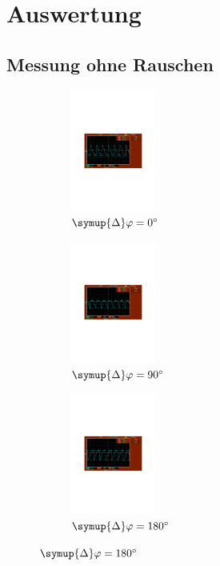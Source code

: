 \section{Auswertung}
\label{sec:Auswertung}

\subsection{Messung ohne Rauschen}
\label{sec:ohne rauschen}

\begin{figure}
  \begin{subfigure}{0.48\textwidth}
    \centering
    \includegraphics[height=4cm]{content/Bilder/unverrauscht/0.pdf}
    \caption{$\symup{\Delta}\varphi = \qty{0}{\degree}$}
  \end{subfigure}
  \begin{subfigure}{0.48\textwidth}
    \centering
    \includegraphics[height=4cm]{content/Bilder/unverrauscht/90.pdf}
    \caption{$\symup{\Delta}\varphi = \qty{90}{\degree}$}
  \end{subfigure}
  \begin{subfigure}{0.48\textwidth}
    \centering
    \includegraphics[height=4cm]{content/Bilder/unverrauscht/180.pdf}
    \caption{$\symup{\Delta}\varphi = \qty{180}{\degree}$}
  \end{subfigure}

\end{figure}
